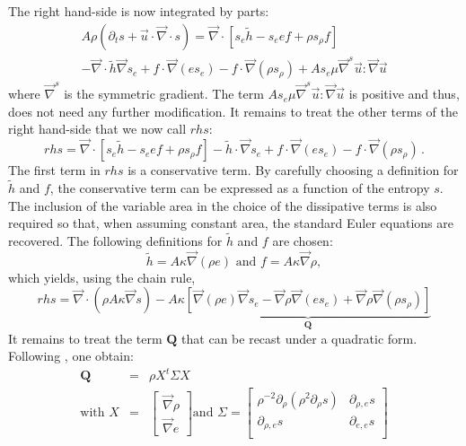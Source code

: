 \documentclass[review,10pt]{elsarticle}
\renewcommand{\div}{\vec{\nabla}\! \cdot \!}
\newcommand{\grad}{\vec{\nabla}}
\begin{document}
%
The right hand-side is now integrated by parts:
%
\begin{multline}
\label{eq:ent_res_app3}
A \rho \left( \partial_t s + \vec{u} \cdot \div s \right) = \div \left[ s_e \tilde{h}-s_e e f  + \rho s_{\rho} f \right]  \\
-\div \tilde{h} \grad s_e  + f \cdot \grad (e s_e) -  f \cdot \grad ( \rho s_{\rho} ) + A s_e \mu \grad^s \vec{u} : \grad \vec{u} 
\end{multline}
%
where $\grad^s$ is the symmetric gradient. The term $A s_e \mu \grad^s \vec{u} : \grad \vec{u}$ is positive and thus, 
does not need any further modification. It %
remains to treat the other terms of the right hand-side that we now call $rhs$:
%
\begin{equation}
rhs = \div \left[ s_e \tilde{h}-s_e e f  + \rho s_{\rho} f \right] - \tilde{h} \cdot \grad s_e  + f \cdot \grad (e s_e) - f \cdot \grad ( \rho s_{\rho} )  \,. \nonumber
\end{equation}
%
The first term in $rhs$ is a conservative term. By carefully choosing a definition for $\tilde{h}$ and $f$, the 
conservative term can be expressed as a function of the entropy $s$. The inclusion of the variable area in the 
choice of the dissipative terms is also required so that, when assuming constant area, the standard Euler 
equations are recovered. The following definitions for $\tilde{h}$ and $f$ are chosen:
%
\begin{equation}
\tilde{h} = A \kappa \grad ( \rho e ) \text{  and  } f = A \kappa \grad \rho, \nonumber 
\end{equation}
%
which yields, using the chain rule,
%
\begin{equation}
rhs = \div (\rho A \kappa \grad s ) - A \kappa \underbrace{\left[ \grad (\rho e) \grad s_e  - \grad \rho \grad (e s_e) +  \grad \rho \grad ( \rho s_{\rho} )  \right]}_{\mathbf{Q}} \nonumber
\end{equation}
%
It remains to treat the term $\mathbf{Q}$ that can be recast under a quadratic form. Following \cite{jlg}, one obtain:
%
\begin{eqnarray}
\mathbf{Q} &=& \rho X^t \Sigma X \nonumber \\
\text{with } X &=& \begin{bmatrix}
\grad \rho \\
\grad e 
\end{bmatrix}
\text{and } \Sigma = \begin{bmatrix}
       \rho^{-2}\partial_{\rho} (\rho^2 \partial_{\rho} s) & \partial_{\rho,e} s  \\[0.3em]
       \partial_{\rho,e} s & \partial_{e,e} s           \\[0.3em]
     \end{bmatrix} \nonumber 
\end{eqnarray}
\end{document}

